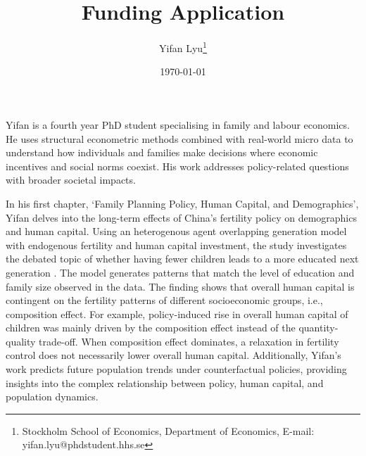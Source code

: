 \documentclass[12pt, letterpaper]{article}
\begin{document}
\providecommand{\titlename}{Funding Application}
\title{\titlename}
\author{
    {Yifan Lyu\thanks{Stockholm School of Economics, Department of Economics, E-mail: \textcolor{brickred}{yifan.lyu@phdstudent.hhs.se}}
    }
}
\date{\monthyeardate\today}
\maketitle %

\vspace{-0.5cm}


Yifan is a fourth year PhD student specialising in family and labour economics. He uses structural econometric methods combined with real-world micro data to understand how individuals and families make decisions where economic incentives and social norms coexist. His work addresses policy-related questions with broader societal impacts.



In his first chapter, `Family Planning Policy, Human Capital, and Demographics', Yifan delves into the long-term effects of China's fertility policy on demographics and human capital. Using an heterogenous agent overlapping generation model with endogenous fertility and human capital investment, the study investigates the debated topic of whether having fewer children leads to a more educated next generation \citep{Zhang2017}. The model generates patterns that match the level of education and family size observed in the data. The finding shows that overall human capital is contingent on the fertility patterns of different socioeconomic groups, i.e., composition effect. For example, policy-induced rise in overall human capital of children was mainly driven by the composition effect instead of the quantity-quality trade-off. When composition effect dominates, a relaxation in fertility control does not necessarily lower overall human capital. Additionally, Yifan's work predicts future population trends under counterfactual policies, providing insights into the complex relationship between policy, human capital, and population dynamics.
\end{document}
